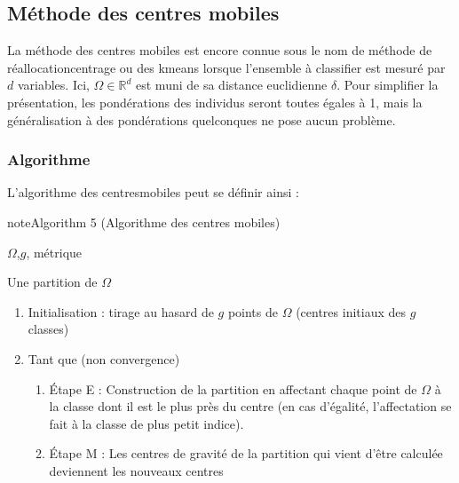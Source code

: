 \documentclass[letterpaper,10pt,french]{sphinxmanual}
\begin{document}
\subsection{Méthode des centres mobiles}
\label{\detokenize{clustering:methode-des-centres-mobiles}}
\ignorespaces 
{}\ignorespaces 
\sphinxAtStartPar
La méthode des centres mobiles est encore connue sous le nom de méthode de réallocation\sphinxhyphen{}centrage ou des k\sphinxhyphen{}means lorsque l’ensemble à classifier est mesuré par \(d\) variables. Ici, \(\Omega \in \mathbb{R}^d\) est muni de sa distance euclidienne \(\delta\). Pour simplifier la présentation, les pondérations des individus seront toutes égales à 1, mais la généralisation à des pondérations quelconques ne pose aucun problème.


\subsubsection{Algorithme}
\label{\detokenize{clustering:id2}}
\sphinxAtStartPar
L’algorithme des centres\sphinxhyphen{}mobiles peut se définir ainsi :
\label{clustering:algorithm-4}
\begin{sphinxadmonition}{note}{Algorithm 5 (Algorithme des centres mobiles)}



\sphinxAtStartPar
{} \(\Omega\),\(g\), métrique

\sphinxAtStartPar
{} Une partition de \(\Omega\)
\begin{enumerate}
%
\item {} 
\sphinxAtStartPar
Initialisation : tirage au hasard de \(g\) points de  \(\Omega\) (centres initiaux des \(g\) classes)

\item {} 
\sphinxAtStartPar
Tant que (non convergence)
\begin{enumerate}
%
\item {} 
\sphinxAtStartPar
Étape E : Construction de la partition en affectant chaque point de \(\Omega\) à la classe dont il est le plus près du centre (en cas d’égalité, l’affectation se fait à la classe de plus petit indice).

\item {} 
\sphinxAtStartPar
Étape M : Les centres de gravité de la partition qui vient d’être calculée deviennent les nouveaux centres

\end{enumerate}

\end{enumerate}
\end{sphinxadmonition}
\end{document}
